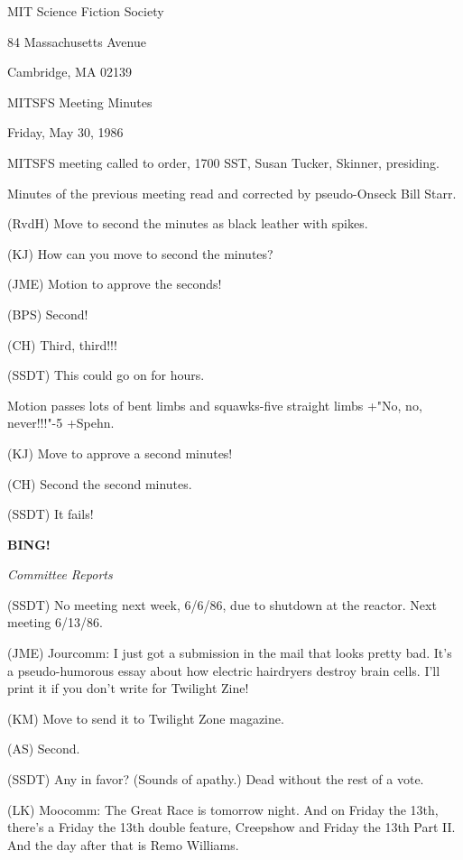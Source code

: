 \documentclass[12pt]{article}
\newcommand{\bing}{{\bf BING!} }
\newcommand{\goto}[1]{\bing \vskip 12pt \centerline{{\em{#1}}}}
\begin{document}
\begin{center}

MIT Science Fiction Society 

84 Massachusetts Avenue

Cambridge, MA 02139

\vspace{12pt}

MITSFS Meeting Minutes 

Friday, May 30, 1986

\end{center}
 
\vspace{18pt}

\setlength{\parskip}{6pt}

\noindent
MITSFS meeting called to order, 1700 SST,
Susan Tucker, Skinner, presiding.

Minutes of the previous meeting read and corrected by pseudo-Onseck Bill Starr.

(RvdH) Move to second the minutes as black leather with spikes.

(KJ) How can you move to second the minutes?

(JME) Motion to approve the seconds!

(BPS) Second!

(CH) Third, third!!!

(SSDT) This could go on for hours.

Motion passes lots of bent limbs and squawks-five straight limbs +"No, no, never!!!"-5 +Spehn.

(KJ) Move to approve a second minutes!

(CH) Second the second minutes.

(SSDT) It fails!

\goto{Committee Reports}

(SSDT) No meeting next week, 6/6/86, due to shutdown at the reactor. Next meeting 6/13/86.

(JME) Jourcomm: I just got a submission in the mail that looks pretty bad. It's a pseudo-humorous essay about how electric hairdryers destroy brain cells. I'll print it if you don't write for Twilight Zine!

(KM) Move to send it to Twilight Zone magazine.

(AS) Second.

(SSDT) Any in favor? (Sounds of apathy.) Dead without the rest of a vote.

(LK) Moocomm: The Great Race is tomorrow night. And on Friday the 13th, there's a Friday the 13th double feature, Creepshow and Friday the 13th Part II. And the day after that is Remo Williams.
\end{document}
